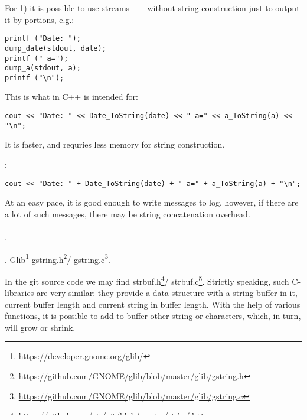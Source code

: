 {For 1) it is possible to use streams ~--- without string construction just to output it by portions, e.g.}:

\begin{lstlisting}
printf ("Date: ");
dump_date(stdout, date);
printf (" a=");
dump_a(stdout, a);
printf ("\n");
\end{lstlisting}

{This is what  in C++ is intended for}:

\begin{lstlisting}
cout << "Date: " << Date_ToString(date) << " a=" << a_ToString(a) << "\n";
\end{lstlisting}

{It is faster, and requries less memory for string construction}.

:

\begin{lstlisting}
cout << "Date: " + Date_ToString(date) + " a=" + a_ToString(a) + "\n";
\end{lstlisting}

{At an easy pace, it is good enough to write messages to log, however, if there are a lot
of such messages, there may be string concatenation overhead}. \\
\\
.

.
 Glib\footnote{\url{https://developer.gnome.org/glib/}} 
gstring.h\footnote{\url{https://github.com/GNOME/glib/blob/master/glib/gstring.h}}/
gstring.c\footnote{\url{https://github.com/GNOME/glib/blob/master/glib/gstring.c}}. 

\label{strbuf}
{In the git source code we may find} strbuf.h\footnote{\url{https://github.com/git/git/blob/master/strbuf.h}}/
strbuf.c\footnote{\url{https://github.com/git/git/blob/master/strbuf.c}}. 
{Strictly speaking, such C-libraries are very similar: they provide a data structure with a string buffer
in it, current buffer length and current string in buffer length}.
{With the help of various functions, it is possible to add to buffer other string or characters,
which, in turn, will grow or shrink}.

